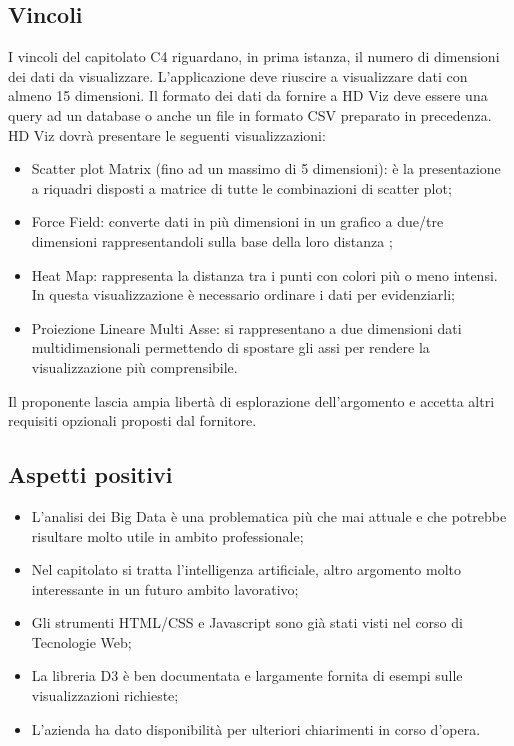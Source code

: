 \subsection{Vincoli}
I vincoli del capitolato C4 riguardano, in prima istanza, il numero di dimensioni dei dati da visualizzare. L'applicazione deve riuscire a visualizzare dati con almeno 15 dimensioni. 
Il formato dei dati da fornire a HD Viz deve essere una query ad un database o anche un file in formato CSV preparato in precedenza.
HD Viz dovrà presentare le seguenti visualizzazioni: 
\begin{itemize}
\item Scatter plot Matrix (fino ad un massimo di 5 dimensioni): è la presentazione a riquadri disposti a matrice di tutte le combinazioni di scatter plot; 
\item Force Field: converte dati in più dimensioni in un grafico a due/tre dimensioni rappresentandoli sulla base della loro distanza ; 
\item Heat Map: rappresenta la distanza tra i punti con colori più o meno intensi. In questa visualizzazione è necessario ordinare i dati per evidenziarli; 
\item Proiezione Lineare Multi Asse: si rappresentano a due dimensioni dati multidimensionali permettendo di spostare gli assi per rendere la visualizzazione più comprensibile.  
\end{itemize} 
Il proponente lascia ampia libertà di esplorazione dell'argomento e accetta altri requisiti opzionali proposti dal fornitore.

\subsection{Aspetti positivi}
\begin{itemize}
\item L'analisi dei Big Data è una problematica più che mai attuale e che potrebbe risultare molto utile in ambito professionale;
\item Nel capitolato si tratta l'intelligenza artificiale, altro argomento molto interessante in un futuro ambito lavorativo;
\item Gli strumenti HTML/CSS e Javascript sono già stati visti nel corso di Tecnologie Web;
\item La libreria D3 è ben documentata e largamente fornita di esempi sulle visualizzazioni richieste;
\item L'azienda ha dato disponibilità per ulteriori chiarimenti in corso d'opera.
\end{itemize}

